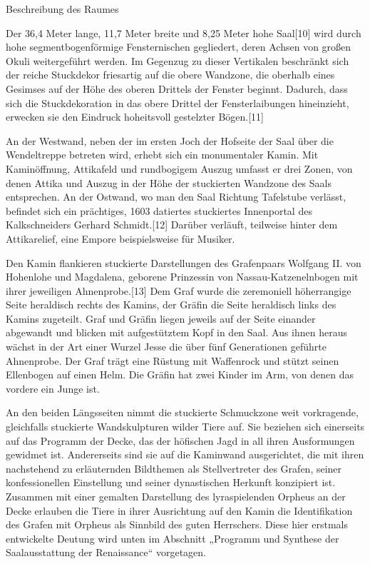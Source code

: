\documentclass[
  letterpaper,
]{book}
\begin{document}
Beschreibung des Raumes

Der 36,4 Meter lange, 11,7 Meter breite und 8,25 Meter hohe Saal{[}10{]}
wird durch hohe segmentbogenförmige Fensternischen gegliedert, deren
Achsen von großen Okuli weitergeführt werden. Im Gegenzug zu dieser
Vertikalen beschränkt sich der reiche Stuckdekor friesartig auf die
obere Wandzone, die oberhalb eines Gesimses auf der Höhe des oberen
Drittels der Fenster beginnt. Dadurch, dass sich die Stuckdekoration in
das obere Drittel der Fensterlaibungen hineinzieht, erwecken sie den
Eindruck hoheitsvoll gestelzter Bögen.{[}11{]}

An der Westwand, neben der im ersten Joch der Hofseite der Saal über die
Wendeltreppe betreten wird, erhebt sich ein monumentaler Kamin. Mit
Kaminöffnung, Attikafeld und rundbogigem Auszug umfasst er drei Zonen,
von denen Attika und Auszug in der Höhe der stuckierten Wandzone des
Saals entsprechen. An der Ostwand, wo man den Saal Richtung Tafelstube
verlässt, befindet sich ein prächtiges, 1603 datiertes stuckiertes
Innenportal des Kalkschneiders Gerhard Schmidt.{[}12{]} Darüber
verläuft, teilweise hinter dem Attikarelief, eine Empore beispielsweise
für Musiker.

Den Kamin flankieren stuckierte Darstellungen des Grafenpaars Wolfgang
II. von Hohenlohe und Magdalena, geborene Prinzessin von
Nassau-Katzenelnbogen mit ihrer jeweiligen Ahnenprobe.{[}13{]} Dem Graf
wurde die zeremoniell höherrangige Seite heraldisch rechts des Kamins,
der Gräfin die Seite heraldisch links des Kamins zugeteilt. Graf und
Gräfin liegen jeweils auf der Seite einander abgewandt und blicken mit
aufgestütztem Kopf in den Saal. Aus ihnen heraus wächst in der Art einer
Wurzel Jesse die über fünf Generationen geführte Ahnenprobe. Der Graf
trägt eine Rüstung mit Waffenrock und stützt seinen Ellenbogen auf einen
Helm. Die Gräfin hat zwei Kinder im Arm, von denen das vordere ein Junge
ist.

An den beiden Längsseiten nimmt die stuckierte Schmuckzone weit
vorkragende, gleichfalls stuckierte Wandskulpturen wilder Tiere auf. Sie
beziehen sich einerseits auf das Programm der Decke, das der höfischen
Jagd in all ihren Ausformungen gewidmet ist. Andererseits sind sie auf
die Kaminwand ausgerichtet, die mit ihren nachstehend zu erläuternden
Bildthemen als Stellvertreter des Grafen, seiner konfessionellen
Einstellung und seiner dynastischen Herkunft konzipiert ist. Zusammen
mit einer gemalten Darstellung des lyraspielenden Orpheus an der Decke
erlauben die Tiere in ihrer Ausrichtung auf den Kamin die Identifikation
des Grafen mit Orpheus als Sinnbild des guten Herrschers. Diese hier
erstmals entwickelte Deutung wird unten im Abschnitt „Programm und
Synthese der Saalausstattung der Renaissance`` vorgetagen.
\end{document}
